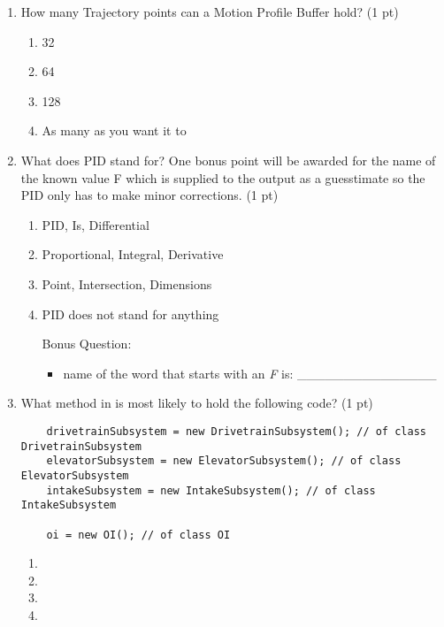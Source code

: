 \documentclass[11pt,fleqn]{article}
\begin{document}
\begin{enumerate}
\item How many Trajectory points can a Motion Profile Buffer hold? (1 pt)
	\begin{enumerate}
	\item 32
	\item 64
	\item 128
	\item As many as you want it to
	\end{enumerate}

\item What does PID stand for? One bonus point will be awarded for the name of the known value F which is supplied to the output as a guesstimate so the PID only has to make minor corrections. (1 pt)
	\begin{enumerate}
	\item PID, Is, Differential
	\item Proportional, Integral, Derivative
	\item Point, Intersection, Dimensions
	\item PID does not stand for anything

    \vspace{3ex}

	Bonus Question:
	\begin{itemize}
	    \item name of the word that starts with an \textit{F} is: \_\_\_\_\_\_\_\_\_\_\_\_\_\_\_
	\end{itemize}

	\end{enumerate}

    \vspace{6ex}

\item What method in  is most likely to hold the following code? (1 pt)
  \begin{verbatim}
    drivetrainSubsystem = new DrivetrainSubsystem(); // of class DrivetrainSubsystem
    elevatorSubsystem = new ElevatorSubsystem(); // of class ElevatorSubsystem
    intakeSubsystem = new IntakeSubsystem(); // of class IntakeSubsystem

    oi = new OI(); // of class OI
  \end{verbatim}

  \begin{enumerate}
    \item {}
    \item {}
    \item {}
    \item {}
  \end{enumerate}


\end{enumerate}
\end{document}
